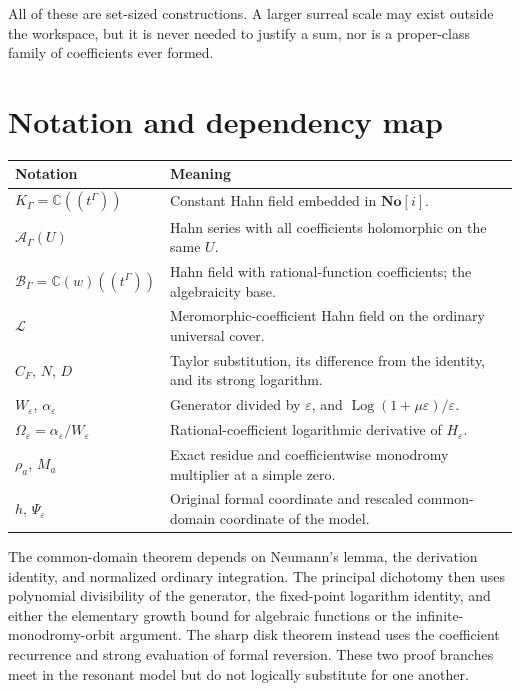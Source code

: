 \documentclass[11pt,a4paper]{article}
\numberwithin{equation}{section}
\theoremstyle{definition}
\theoremstyle{remark}
\newcommand{\C}{\mathbb C}
\newcommand{\No}{\mathbf{No}}
\newcommand{\K}{K_\Gamma}
\newcommand{\A}{\mathscr A_\Gamma}
\newcommand{\B}{\mathscr B_\Gamma}
\newcommand{\eps}{\varepsilon}
\newcommand{\Log}{\operatorname{Log}}
\begin{document}
All of these are set-sized constructions.  A larger surreal scale may
exist outside the workspace, but it is never needed to justify a sum, nor
is a proper-class family of coefficients ever formed.

\section{Notation and dependency map}

\begin{center}
\small
\begin{tabular}{@{}p{}p{}@{}}
\toprule
Notation & Meaning\\
\midrule
$\K=\C((t^\Gamma))$ & Constant Hahn field embedded in $\No[i]$.\\[3pt]
$\A(U)$ & Hahn series with all coefficients holomorphic on the same $U$.\\[3pt]
$\B=\C(w)((t^\Gamma))$ & Hahn field with rational-function coefficients; the algebraicity base.\\[3pt]
$\mathscr L$ & Meromorphic-coefficient Hahn field on the ordinary universal cover.\\[3pt]
$C_F$, $N$, $D$ & Taylor substitution, its difference from the identity, and its strong logarithm.\\[3pt]
$W_\eps$, $\alpha_\eps$ & Generator divided by $\eps$, and $\Log(1+\mu\eps)/\eps$.\\[3pt]
$\Omega_\eps=\alpha_\eps/W_\eps$ & Rational-coefficient logarithmic derivative of $H_\eps$.\\[3pt]
$\rho_a$, $M_a$ & Exact residue and coefficientwise monodromy multiplier at a simple zero.\\[3pt]
$h$, $\Psi_\eps$ & Original formal coordinate and rescaled common-domain coordinate of the model.\\
\bottomrule
\end{tabular}
\end{center}

The common-domain theorem depends on Neumann's lemma, the derivation
identity, and normalized ordinary integration.  The principal dichotomy
then uses polynomial divisibility of the generator, the fixed-point
logarithm identity, and either the elementary growth bound for algebraic
functions or the infinite-monodromy-orbit argument.  The sharp disk theorem
instead uses the coefficient recurrence and strong evaluation of formal
reversion.  These two proof branches meet in the resonant model but do not
logically substitute for one another.
\end{document}
